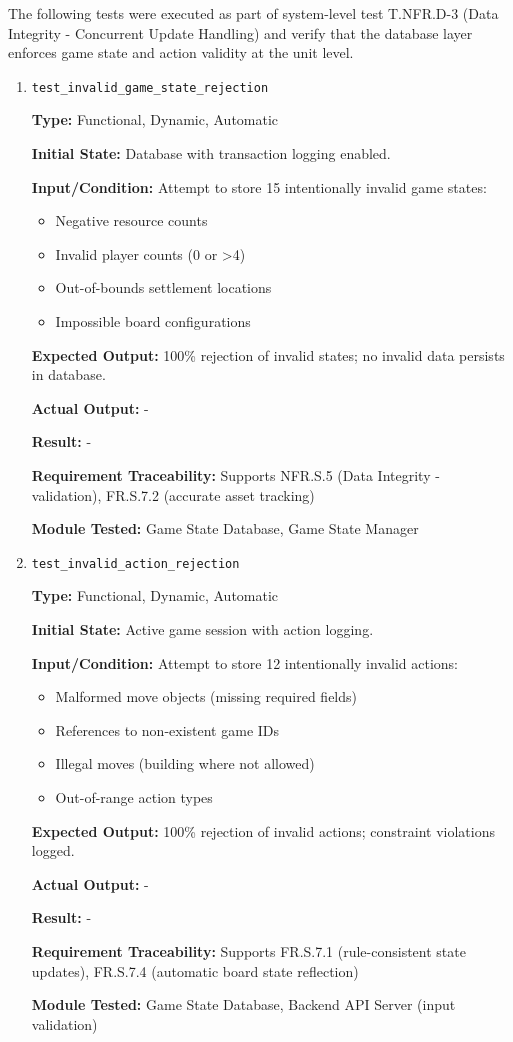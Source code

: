 \documentclass[12pt, titlepage]{article}
\begin{document}
The following tests were executed as part of system-level test T.NFR.D-3 (Data Integrity - Concurrent Update Handling) and verify that the database layer enforces game state and action validity at the unit level.

\begin{enumerate}

\item \texttt{test\_invalid\_game\_state\_rejection}

\textbf{Type:} Functional, Dynamic, Automatic

\textbf{Initial State:} Database with transaction logging enabled.

\textbf{Input/Condition:} Attempt to store 15 intentionally invalid game states:
\begin{itemize}
    \item Negative resource counts
    \item Invalid player counts (0 or >4)
    \item Out-of-bounds settlement locations
    \item Impossible board configurations
\end{itemize}

\textbf{Expected Output:} 100\% rejection of invalid states; no invalid data persists in database.

\textbf{Actual Output:} -

\textbf{Result:} -

\textbf{Requirement Traceability:} Supports NFR.S.5 (Data Integrity - validation), FR.S.7.2 (accurate asset tracking)

\textbf{Module Tested:} Game State Database, Game State Manager


\item \texttt{test\_invalid\_action\_rejection}

\textbf{Type:} Functional, Dynamic, Automatic

\textbf{Initial State:} Active game session with action logging.

\textbf{Input/Condition:} Attempt to store 12 intentionally invalid actions:
\begin{itemize}
    \item Malformed move objects (missing required fields)
    \item References to non-existent game IDs
    \item Illegal moves (building where not allowed)
    \item Out-of-range action types
\end{itemize}

\textbf{Expected Output:} 100\% rejection of invalid actions; constraint violations logged.

\textbf{Actual Output:} -

\textbf{Result:} -

\textbf{Requirement Traceability:} Supports FR.S.7.1 (rule-consistent state updates), FR.S.7.4 (automatic board state reflection)

\textbf{Module Tested:} Game State Database, Backend API Server (input validation)

\end{enumerate}
\end{document}
